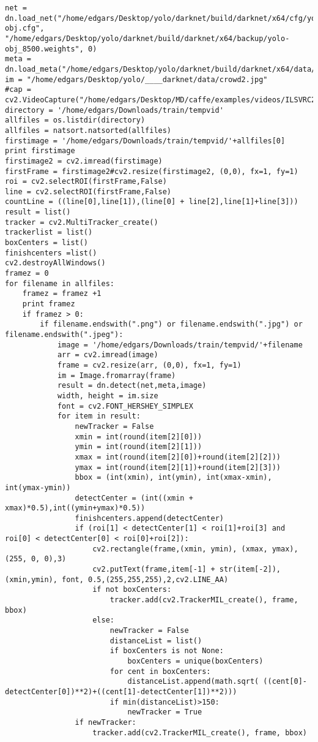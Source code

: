 \documentclass[12pt,paper=a4]{report}
\begin{document}
\begin{lstlisting}
net = dn.load_net("/home/edgars/Desktop/yolo/darknet/build/darknet/x64/cfg/yolo-obj.cfg", "/home/edgars/Desktop/yolo/darknet/build/darknet/x64/backup/yolo-obj_8500.weights", 0)
meta = dn.load_meta("/home/edgars/Desktop/yolo/darknet/build/darknet/x64/data/obj.data")
im = "/home/edgars/Desktop/yolo/____darknet/data/crowd2.jpg"
#cap = cv2.VideoCapture("/home/edgars/Desktop/MD/caffe/examples/videos/ILSVRC2015_train_00755001.mp4")
directory = '/home/edgars/Downloads/train/tempvid'
allfiles = os.listdir(directory)
allfiles = natsort.natsorted(allfiles)
firstimage = '/home/edgars/Downloads/train/tempvid/'+allfiles[0]
print firstimage
firstimage2 = cv2.imread(firstimage) 
firstFrame = firstimage2#cv2.resize(firstimage2, (0,0), fx=1, fy=1)
roi = cv2.selectROI(firstFrame,False)
line = cv2.selectROI(firstFrame,False)
countLine = ((line[0],line[1]),(line[0] + line[2],line[1]+line[3]))
result = list()
tracker = cv2.MultiTracker_create()    
trackerlist = list()
boxCenters = list()
finishcenters =list()
cv2.destroyAllWindows() 
framez = 0
for filename in allfiles:
	framez = framez +1
	print framez
	if framez > 0:
		if filename.endswith(".png") or filename.endswith(".jpg") or filename.endswith(".jpeg"): 
			image = '/home/edgars/Downloads/train/tempvid/'+filename
			arr = cv2.imread(image)  
			frame = cv2.resize(arr, (0,0), fx=1, fy=1)        
			im = Image.fromarray(frame)      
			result = dn.detect(net,meta,image)
			width, height = im.size
			font = cv2.FONT_HERSHEY_SIMPLEX  
			for item in result:
				newTracker = False
				xmin = int(round(item[2][0]))
				ymin = int(round(item[2][1]))
				xmax = int(round(item[2][0])+round(item[2][2]))
				ymax = int(round(item[2][1])+round(item[2][3]))
				bbox = (int(xmin), int(ymin), int(xmax-xmin), int(ymax-ymin))
				detectCenter = (int((xmin + xmax)*0.5),int((ymin+ymax)*0.5))
				finishcenters.append(detectCenter)
				if (roi[1] < detectCenter[1] < roi[1]+roi[3] and roi[0] < detectCenter[0] < roi[0]+roi[2]):
					cv2.rectangle(frame,(xmin, ymin), (xmax, ymax),(255, 0, 0),3)
					cv2.putText(frame,item[-1] + str(item[-2]),(xmin,ymin), font, 0.5,(255,255,255),2,cv2.LINE_AA)
					if not boxCenters:
						tracker.add(cv2.TrackerMIL_create(), frame, bbox)
					else:
						newTracker = False
						distanceList = list()
						if boxCenters is not None:
							boxCenters = unique(boxCenters)
						for cent in boxCenters:
							distanceList.append(math.sqrt( ((cent[0]-detectCenter[0])**2)+((cent[1]-detectCenter[1])**2)))
						if min(distanceList)>150:
							newTracker = True
				if newTracker:
					tracker.add(cv2.TrackerMIL_create(), frame, bbox)

\end{lstlisting}
\end{document}
